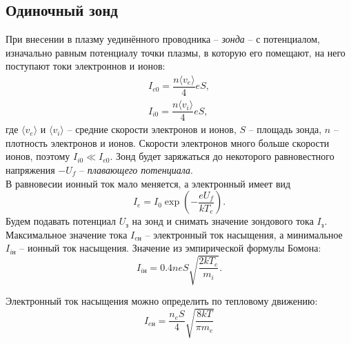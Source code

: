 \documentclass[a4paper, 12pt]{article}
\begin{document}
        \subsection*{Одиночный зонд}
        При внесении в плазму уединённого проводника -- \textit{зонда} -- с потенциалом, изначально равным потенциалу точки плазмы, в которую его помещают, на него поступают токи электроннов и ионов:
        \begin{equation}
                \begin{array}{c}
                        I_{e0} = \dfrac{n \langle v_e \rangle}{4}eS,\\
                        I_{i0} = \dfrac{n \langle v_i \rangle}{4}eS,
                \end{array}
        \end{equation}
        где $\langle v_e \rangle$ и $\langle v_i \rangle$ -- средние скорости электронов и ионов, $S$ -- площадь зонда, $n$ -- плотность электронов и ионов. Скорости электронов много больше скорости ионов, поэтому $I_{i0} \ll I_{e0}$. Зонд будет заряжаться до некоторого равновестного напряжения $-U_f$ -- \textit{плавающего потенциала}.\\
        В равновесии ионный ток мало меняется, а электронный имеет вид
        $$
        I_e = I_0 \exp\left( -\dfrac{eU_f}{kT_e} \right).
        $$
        Будем подавать потенциал $U_\text{з}$ на зонд и снимать значение зондового тока $I_\text{з}$. Максимальное значение тока $I_{e\text{н}}$ -- электронный ток насыщения, а минимальное $I_{i\text{н}}$ -- ионный ток насыщения. Значение из эмпирической формулы Бомона:
        \begin{equation}
                I_{i\text{н}} = 0.4 neS \sqrt{\dfrac{2kT_e}{m_i}}.
        \end{equation}

        Электронный ток насыщения можно определить по тепловому движению:
        \[I_{e\text{н}} = \frac{n_eS}{4}\sqrt{\frac{8kT}{\pi m_e}}\]
\end{document}
